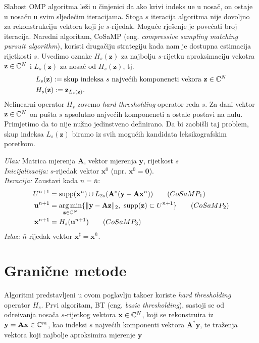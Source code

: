 \documentclass[a4paper,twoside,12pt]{memoir} %
\newcommand{\vect}[1]{\mathbf{#1}}
\renewcommand{\vec}{\vect}
\newcommand{\supp}{\text{\normalfont{supp}}}
\newcommand{\norm}[1]{\|{#1}\|}
\DeclareMathOperator*{\argmin}{arg\,min}
\newenvironment{alg}[1]
{
    \bigskip
    \begin{tcolorbox}[arc=0mm,boxrule=1.2pt,colframe=black,colback=white,detach title, before upper={\medskip\begin{center}\textbf{#1}\end{center}\hline\newline\medskip},frame hidden]
    \medskip
}
{
    \medskip
\end{tcolorbox}
    \bigskip
}
\begin{document}
\indent
Slabost OMP algoritma le\v{z}i u \v{c}injenici da ako krivi indeks u\dj e u nosa\v{c}, on ostaje u nosa\v{c}u u svim sljede\'cim iteracijama. Stoga $s$ iteracija algoritma nije dovoljno za rekonstrukciju vektora koji je $s$-rijedak. Mogu\'ce rje\v{s}enje je pove\'cati broj iteracija. Naredni algoritam, CoSaMP (eng. \textit{compressive sampling matching pursuit algorithm}), koristi druga\v{c}iju strategiju kada nam je dostupna estimacija rijetkosti $s$. Uvedimo oznake $H_s(\vec z)$ za najbolju $s$-rijetku aproksimaciju vekotra $\vec z \in \C^N$ i $L_s(\vec z)$ za nosa\v{c} od $H_s(\vec z)$, tj.
\begin{align}
    &L_s(\vec z) := \text{skup indeksa $s$ najve\'cih komponeneti vekora } \vec z \in \C^N \\
    &H_s(\vec z) := \vec z_{L_s(\vec z)}.
\end{align}
Nelinearni operator $H_s$ zovemo \textit{hard thresholding} operator reda $s$. Za dani vektor $\vec z \in \C^N$ on pu\v{s}ta $s$ apsolutno najve\'cih komponeneti a ostale postavi na nulu. Primjetimo da to nije nu\v{z}no jedinstveno definirano. Da bi zaobi\v{s}li taj problem, skup indeksa $L_s(\vec z)$ biramo iz svih mogu\'cih kandidata leksikografskim poretkom.

\begin{alg}{CoSaMP}
    \textit{Ulaz:} Matrica mjerenja $\vec A$, vektor mjerenja $\vec y$, rijetkost $s$ \\
    \textit{Inicijalizacija:} $s$-rijedak vektor $\vec x^0$ (npr. $\vec x^0 = \vec 0$).\\
    \textit{Iteracija:} Zaustavi kada $n = \bar{n}$:
        \begin{align*}
            U^{n+1} & = \supp(\vec x^n)\cup L_{2s}(\vec A^*(\vec y - \vec{Ax}^n))  \tag{$CoSaMP_1$}\label{cosamp_1}\\
            \vec u^{n+1} & = \argmin_{\vec z \in \C^N}\{\norm{\vec y - \vec{Az}}_2,\ \supp(\vec z) \subset U^{n+1}\}  \tag{$CoSaMP_2$}\label{cosamp_2}\\
            \vec x^{n+1} & = H_s(\vec u^{n+1})  \tag{$CoSaMP_3$}\label{cosamp_3}
        \end{align*}
        \textit{Izlaz:} $\bar{n}$-rijedak vektor $\vec x^{\sharp}=\vec{x}^{\bar{n}}$.
\end{alg}



\section[Grani\v{c}ne metode][Grani\v{c}ne metode]{Grani\v{c}ne metode}
Algoritmi predstavljeni u ovom poglavlju tako\dj er koriste \textit{hard thresholding} operator $H_s$. Prvi algoritam, BT (eng. \textit{basic thresholding}), sastoji se od odre\dj ivanja nosa\v{c}a $s$-rijetkog vektora $\vec x \in \C^N$, koji se rekonstruira iz $\vec y = \vec{Ax} \in \C^m$, kao indeksi $s$ najve\'cih komponenti vektora $\vec A^* \vec y$, te tra\v{z}enja vektora koji najbolje aproksimira mjerenje $\vec y$
\end{document}
